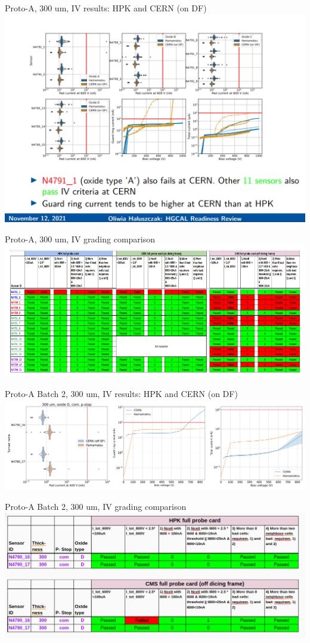 \documentclass{beamer}
\begin{document}
\begin{frame}{Proto-A, 300 um, IV results: HPK and CERN (on DF)}
  \includegraphics[width=.8\textwidth]{plots/IV_CERN_HPK_300um.png}
\end{frame}

\begin{frame}{Proto-A, 300 um, IV grading comparison}
  \includegraphics[width=.8\textwidth]{plots/IV_grading_300um.png}
\end{frame}

\begin{frame}{Proto-A Batch 2, 300 um, IV results: HPK and CERN (on DF)}
  \includegraphics[width=.8\textwidth]{plots/IV_Comparison_SensorsHPK_300um.png}
\end{frame}

\begin{frame}{Proto-A Batch 2, 300 um, IV grading comparison}
  \includegraphics[width=.8\textwidth]{plots/IV_grading_300um_2.png}
\end{frame}
\end{document}

